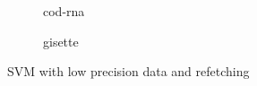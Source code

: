 \documentclass{article}
\begin{document}
\begin{figure}[t]
\centering
    \begin{subfigure}[h]{.4\columnwidth}
    \caption{cod-rna}
    \end{subfigure}
    \begin{subfigure}[h]{.4\columnwidth}
    \caption{gisette}
    \end{subfigure}
    
\caption{SVM with low precision data and refetching}
\label{fig:refetch}
\end{figure}



\end{document}
